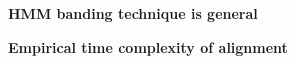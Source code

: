 \documentclass[landscape]{slides}
\begin{document}
\begin{slide}
\begin{center}
\large
\textbf{HMM banding technique is general}
\end{center}

\small
\hspace{3.3in} 
\textbf{Empirical time complexity of alignment}

\vfill
\end{slide}
\end{document}
